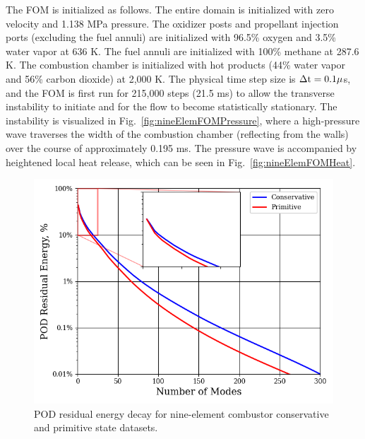 The FOM is initialized as follows. The entire domain is initialized with zero velocity and 1.138 MPa pressure. The oxidizer posts and propellant injection ports (excluding the fuel annuli) are initialized with 96.5\% oxygen and 3.5\% water vapor at 636 K. The fuel annuli are initialized with 100\% methane at 287.6 K. The combustion chamber is initialized with hot products (44\% water vapor and 56\% carbon dioxide) at 2,000 K. The physical time step size is $\Delta \text{t} = 0.1 \mu$s, and the FOM is first run for 215,000 steps (21.5 ms) to allow the transverse instability to initiate and for the flow to become statistically stationary. The instability is visualized in Fig.~\ref{fig:nineElemFOMPressure}, where a high-pressure wave traverses the width of the combustion chamber (reflecting from the walls) over the course of approximately 0.195 ms. The pressure wave is accompanied by heightened local heat release, which can be seen in Fig.~\ref{fig:nineElemFOMHeat}.

\begin{figure}
	\centering
	\includegraphics[width=0.8\linewidth]{Chapters/HPROMResults/Images/nineElem/nineElem_pod_energy.png}
	\caption{\label{fig:nineElemPODEnergy}POD residual energy decay for nine-element combustor conservative and primitive state datasets.}
\end{figure}

